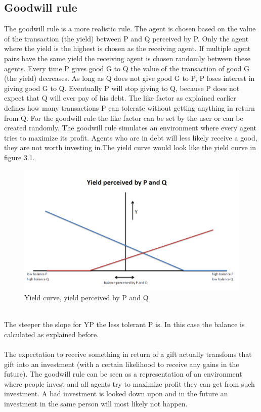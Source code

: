 \documentclass[twoside,openright]{uva-bachelor-thesis}
\begin{document}
\subsection{Goodwill rule}
The goodwill rule is a more realistic rule. The agent is chosen based on the value of the transaction (the yield) between P and Q perceived by P. Only the agent where the yield is the highest is chosen as the receiving agent. If multiple agent pairs have the same yield the receiving agent is chosen randomly between these agents. Every time P gives good G to Q the value of the transaction of good G (the yield) decreases. As long as Q does not give good G to P, P loses interest in giving good G to Q. Eventually P will stop giving to Q, because P does not expect that Q will ever pay of his debt. The like factor as explained earlier defines how many transactions P can tolerate without getting anything in return from Q. For the goodwill rule the like factor can be set by the user or can be created randomly. The goodwill rule simulates an environment where every agent tries to maximize its profit. Agents who are in debt will less likely receive a good, they are not worth investing in.The yield curve would look like the yield curve in figure 3.1.\\
\begin{figure}[h!]
  \centering
    \includegraphics[scale=0.4]{YieldCurves/yieldcurve_PQ} 
\caption{Yield curve, yield perceived by P and Q}
\end{figure}
\\
The steeper the slope for YP the less tolerant P is. In this case the balance is calculated as explained before.
\\
\\
The expectation to receive something in return of a gift actually transfoms that gift into an investment (with a certain likelihood to receive any gains in the future). The goodwill rule can be seen as a representation of an environment where people invest and all agents try to maximize profit they can get from such investment. A bad investment is looked down upon and in the future an investment in the same person will most likely not happen.
\end{document}
